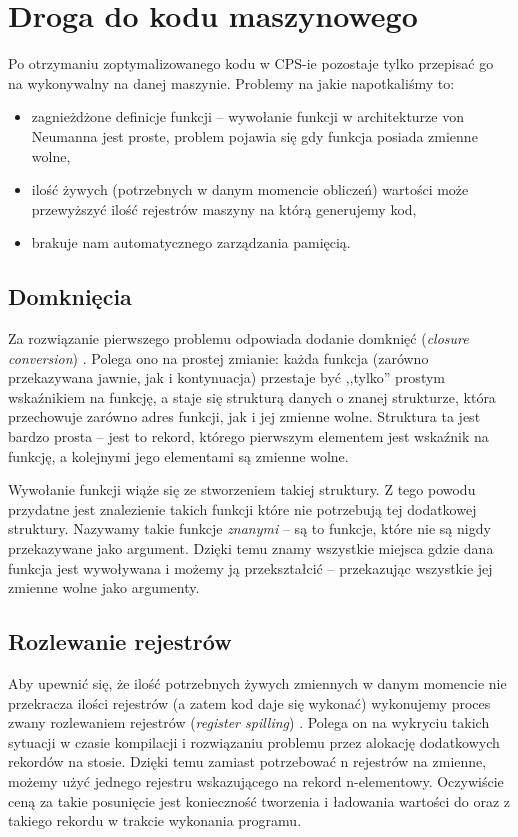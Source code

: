 \documentclass[11pt]{scrartcl}
\begin{document}
\section{Droga do kodu maszynowego}
Po otrzymaniu zoptymalizowanego kodu w CPS-ie pozostaje tylko przepisać go
na wykonywalny na danej maszynie. Problemy na jakie napotkaliśmy to:
\begin{itemize}
  \item zagnieżdżone definicje funkcji -- wywołanie funkcji w architekturze von
    Neumanna jest proste, problem pojawia się gdy funkcja posiada zmienne wolne,
\item ilość żywych (potrzebnych w danym momencie obliczeń) wartości może
  przewyższyć ilość rejestrów maszyny na którą generujemy kod,
\item brakuje nam automatycznego zarządzania pamięcią.
\end{itemize}


\subsection{Domknięcia}
Za rozwiązanie pierwszego problemu odpowiada dodanie domknięć (\textit{closure
conversion}) \cite[Chapter 10: Closure conversion]{Appel}. Polega ono na prostej zmianie: każda funkcja (zarówno przekazywana
jawnie, jak i kontynuacja) przestaje być ,,tylko'' prostym wskaźnikiem na funkcję,
a staje się strukturą danych o znanej strukturze, która przechowuje zarówno
adres funkcji, jak i jej zmienne wolne. Struktura ta jest bardzo prosta -- jest
to rekord, którego pierwszym elementem jest wskaźnik na funkcję, a kolejnymi
jego elementami są zmienne wolne.

Wywołanie funkcji wiąże się ze stworzeniem takiej struktury. Z tego powodu
przydatne jest znalezienie takich funkcji które nie potrzebują tej dodatkowej
struktury. Nazywamy takie funkcje \textit{znanymi} -- są to funkcje, które nie są nigdy
przekazywane jako argument. Dzięki temu znamy wszystkie miejsca gdzie dana
funkcja jest wywoływana i możemy ją przekształcić -- przekazując wszystkie jej
zmienne wolne jako argumenty.

\subsection{Rozlewanie rejestrów}
Aby upewnić się, że ilość potrzebnych żywych zmiennych w danym momencie nie
przekracza ilości rejestrów (a zatem kod daje się wykonać) wykonujemy proces
zwany rozlewaniem rejestrów (\textit{register spilling}) \cite[Register
spilling]{Appel}. Polega on na wykryciu
takich sytuacji w czasie kompilacji i rozwiązaniu problemu przez alokację
dodatkowych rekordów na stosie. Dzięki temu zamiast potrzebować n rejestrów na
zmienne, możemy użyć jednego rejestru wskazującego na rekord n-elementowy.
Oczywiście ceną za takie posunięcie jest konieczność tworzenia i ładowania
wartości do oraz z takiego rekordu w trakcie wykonania programu.
\end{document}
